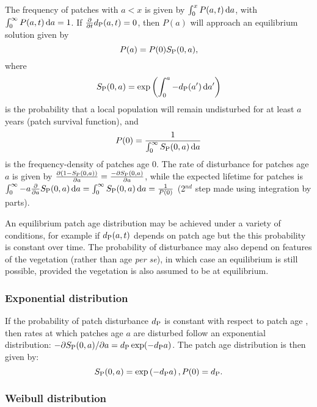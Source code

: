 \documentclass[10pt,twoside]{article}
\begin{document}
The frequency of patches with \(a < x\) is given by
\(\int_{0}^{x}P(a, t) \, {\rm d}a\), with
\(\int_{0}^{\infty} P(a, t) \, {\rm d}a = 1\). If
\(\frac{\partial}{\partial t}d_{\rm P}(a, t) = 0\), then \(P(a)\) will
approach an equilibrium solution given by \[P(a) = P(0) S_{\rm P}(0, a),\] where
\[S_{\rm P}(0, a) = \exp \left( \int_{0}^{a}-d_{\rm P}(a^\prime) \, {\rm d}a^\prime\right)\]
is the probability that a local population will remain undisturbed for
at least \(a\) years (patch survival function), and
\[P(0) = \frac1{ \int_{0}^{\infty}S_{\rm P}(0, a) \, {\rm d}a}\] is the
frequency-density of patches age 0. The rate of disturbance for patches
age \(a\) is given by
\(\frac{\partial (1-S_{\rm P}(0, a))}{\partial a} = \frac{-\partial S_{\rm P}(0, a)}{\partial a}\),
while the expected lifetime for patches is
\(\int_0^\infty - a \frac{\partial}{\partial a} S_{\rm P}(0, a) \, {\rm d} a = \int_0^\infty S_{\rm P}(0, a) \, {\rm d} a = \frac1{P(0)}\)
(2\(^{nd}\) step made using integration by parts).

An equilibrium patch age distribution may be achieved under a variety of
conditions, for example if \(d_{\rm P}(a, t)\) depends on patch age but the
this probability is constant over time. The probability of disturbance
may also depend on features of the vegetation (rather than age \emph{per
se}), in which case an equilibrium is still possible, provided the
vegetation is also assumed to be at equilibrium.

\subsubsection{Exponential distribution}\label{exponential-distribution}

If the probability of patch disturbance \(d_{\rm P}\) is constant with respect to
patch age , then rates at which patches age \(a\) are
disturbed follow an exponential distribution:
\(-\partial S_{\rm P}(0, a)/ \partial a = d_{\rm P} \exp(-d_{\rm P} a)\). The patch age
distribution is then given by:
\[ S_{\rm P}(0, a) = \exp\left(-d_{\rm P} a\right), P(0) = d_{\rm P}.\]

\subsubsection{Weibull distribution}\label{weibull-distribution}
\end{document}
